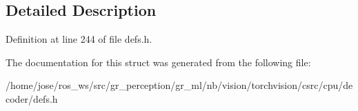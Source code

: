 \subsection{Detailed Description}


Definition at line 244 of file defs.\+h.



The documentation for this struct was generated from the following file\+:\begin{DoxyCompactItemize}
\item 
/home/jose/ros\+\_\+ws/src/gr\+\_\+perception/gr\+\_\+ml/nb/vision/torchvision/csrc/cpu/decoder/defs.\+h\end{DoxyCompactItemize}
